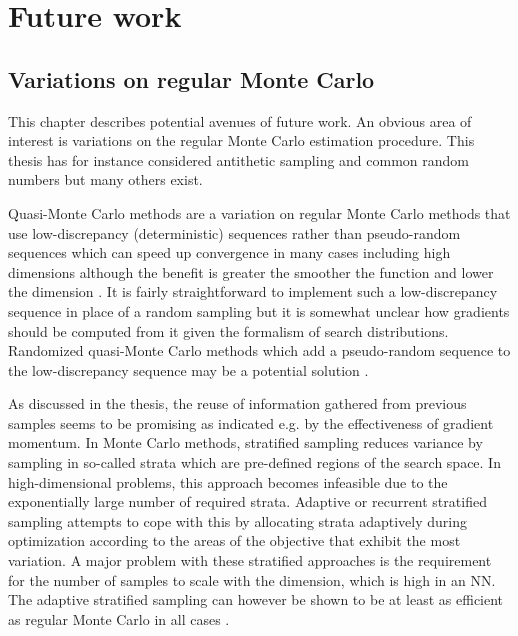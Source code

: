 
\chapter{Future work}\label{chp: Future work}


\section{Variations on regular Monte Carlo}
This chapter describes potential avenues of future work. An obvious area of interest is variations on the regular Monte Carlo estimation procedure. This thesis has for instance considered antithetic sampling and common random numbers but many others exist.

Quasi-Monte Carlo methods are a variation on regular Monte Carlo methods that use low-discrepancy (deterministic) sequences rather than pseudo-random sequences which can speed up convergence in many cases including high dimensions although the benefit is greater the smoother the function and lower the dimension \cite{Morokoff1995}. It is fairly straightforward to implement such a low-discrepancy sequence in place of a random sampling but it is somewhat unclear how gradients should be computed from it given the formalism of search distributions. Randomized quasi-Monte Carlo methods which add a pseudo-random sequence to the low-discrepancy sequence may be a potential solution \cite{LEcuyer2016}.
 
As discussed in the thesis, the reuse of information gathered from previous samples seems to be promising as indicated e.g. by the effectiveness of gradient momentum. In Monte Carlo methods, stratified sampling reduces variance by sampling in so-called strata which are pre-defined regions of the search space. In high-dimensional problems, this approach becomes infeasible due to the exponentially large number of required strata. Adaptive or recurrent stratified sampling \cite{Carpentier2012} attempts to cope with this by allocating strata adaptively during optimization according to the areas of the objective that exhibit the most variation. A major problem with these stratified approaches is the requirement for the number of samples to scale with the dimension, which is high in an \gls{NN}. The adaptive stratified sampling can however be shown to be at least as efficient as regular Monte Carlo in all cases \cite{Carpentier2012}.

